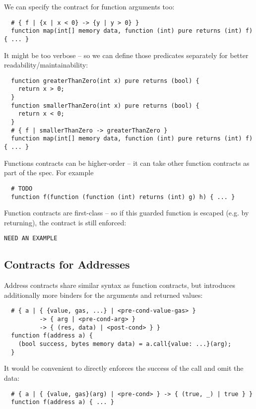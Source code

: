 \documentclass[acmsmall,review,anonymous]{acmart}\settopmatter{printfolios=true,printccs=false,printacmref=false}
\begin{document}
We can specify the contract for function arguments too:
\begin{lstlisting}
  # { f | {x | x < 0} -> {y | y > 0} }
  function map(int[] memory data, function (int) pure returns (int) f) { ... }
\end{lstlisting}
It might be too verbose -- so we can define those predicates separately for better readability/maintainability:
\begin{lstlisting}
  function greaterThanZero(int x) pure returns (bool) {
    return x > 0;
  }
  function smallerThanZero(int x) pure returns (bool) {
    return x < 0;
  }
  # { f | smallerThanZero -> greaterThanZero }
  function map(int[] memory data, function (int) pure returns (int) f) { ... }
\end{lstlisting}

Functions contracts can be higher-order -- it can take other function contracts
as part of the spec. For example
\begin{lstlisting}
  # TODO
  function f(function (function (int) returns (int) g) h) { ... }
\end{lstlisting}

Function contracts are first-class -- so if this guarded function is escaped
(e.g. by returning), the contract is still enforced:
\begin{lstlisting}
NEED AN EXAMPLE
\end{lstlisting}


\subsection{Contracts for Addresses}

Address contracts share similar syntax as function contracts, but introduces
additionally more binders for the arguments and returned values:

\begin{lstlisting}
  # { a | { {value, gas, ...} | <pre-cond-value-gas> }
          -> { arg | <pre-cond-arg> }
          -> { (res, data) | <post-cond> } }
  function f(address a) {
    (bool success, bytes memory data) = a.call{value: ...}(arg);
  }
\end{lstlisting}

It would be convenient to directly enforces the success of the call and omit
the data:
\begin{lstlisting}
  # { a | { {value, gas}(arg) | <pre-cond> } -> { (true, _) | true } }
  function f(address a) { ... }
\end{lstlisting}
\end{document}
